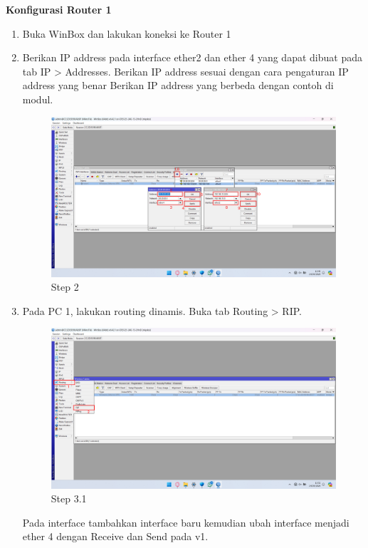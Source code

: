\begin{center}
	\textbf{Konfigurasi Router 1}
	\begin{enumerate}
		\item Buka WinBox dan lakukan koneksi ke Router 1
		\item Berikan IP address pada interface ether2 dan ether 4 yang dapat dibuat pada tab IP > Addresses. Berikan IP address sesuai dengan cara pengaturan IP address yang benar Berikan IP address yang berbeda dengan contoh di modul.
		\begin{figure}[H]
			\centering
			\includegraphics[width=0.9\linewidth]{P2/img/per1/pc1/Step 2.png}
			\caption{Step 2}
			\label{fig:Step 2(Per.2 PC1)}
		\end{figure}
		\item Pada PC 1, lakukan routing dinamis. Buka tab Routing > RIP. 
		\begin{figure}[H]
			\centering
			\includegraphics[width=0.9\linewidth]{P2/img/per2/pc1/Step 3.1.png}
			\caption{Step 3.1}
			\label{fig:Step 3.1(Per.2 PC1)}
		\end{figure}
		Pada interface tambahkan interface baru kemudian ubah interface menjadi ether 4 dengan Receive dan Send pada v1.
		\begin{figure}[H]

\end{figure}
\end{enumerate}
\end{center}
